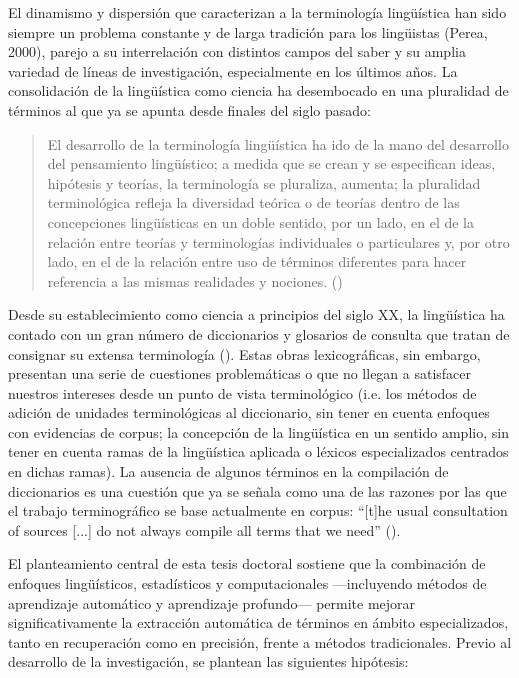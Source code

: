 El dinamismo y dispersión que caracterizan a la terminología lingüística han sido siempre un problema constante y de larga tradición para los lingüistas (Perea, 2000), parejo a su interrelación con distintos campos del saber y su amplia variedad de líneas de investigación, especialmente en los últimos años. La consolidación de la lingüística como ciencia ha desembocado en una pluralidad de términos al que ya se apunta desde finales del siglo pasado:

\begin{quote}
    El desarrollo de la terminología lingüística ha ido de la mano del desarrollo del pensamiento lingüístico; a medida que se crean y se especifican ideas, hipótesis y teorías, la terminología se pluraliza, aumenta; la pluralidad terminológica refleja la diversidad teórica o de teorías dentro de las concepciones lingüísticas en un doble sentido, por un lado, en el de la relación entre teorías y terminologías individuales o particulares y, por otro lado, en el de la relación entre uso de términos diferentes para hacer referencia a las mismas realidades y nociones. (\cite{caballero1994reflexiones})
\end{quote}

Desde su establecimiento como ciencia a principios del siglo XX, la lingüística ha contado con un gran número de diccionarios y glosarios de consulta que tratan de consignar su extensa terminología (\cite{laborda2017diccionarios}). Estas obras lexicográficas, sin embargo, presentan una serie de cuestiones problemáticas o que no llegan a satisfacer nuestros intereses desde un punto de vista terminológico (i.e. los métodos de adición de unidades terminológicas al diccionario, sin tener en cuenta enfoques con evidencias de corpus; la concepción de la lingüística en un sentido amplio, sin tener en cuenta ramas de la lingüística aplicada o léxicos especializados centrados en dichas ramas). La ausencia de algunos términos en la compilación de diccionarios es una cuestión que ya se señala como una de las razones por las que el trabajo terminográfico se base actualmente en corpus: “[t]he usual consultation of sources [...] do not always compile all terms that we need” (\cite{oliver2007}).

El planteamiento central de esta tesis doctoral sostiene que la combinación de enfoques lingüísticos, estadísticos y computacionales —incluyendo métodos de aprendizaje automático y aprendizaje profundo— permite mejorar significativamente la extracción automática de términos en ámbito especializados, tanto en recuperación como en precisión, frente a métodos tradicionales. Previo al desarrollo de la investigación, se plantean las siguientes hipótesis:

